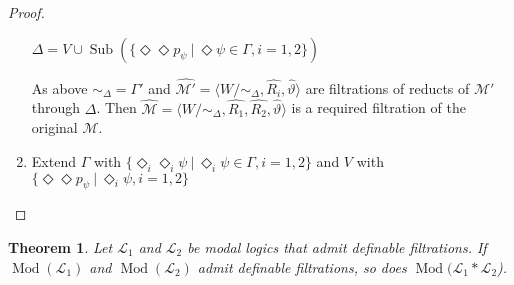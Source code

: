 \documentclass[a4paper]{article}
\theoremstyle{defin}
\theoremstyle{theorem}
\newtheorem{theorem}{Theorem}
\theoremstyle{prop}
\theoremstyle{lemma}
\theoremstyle{fact}
\theoremstyle{exercise}
\theoremstyle{ex}
\theoremstyle{col}
\theoremstyle{claim}
\begin{document}
\begin{proof}
\begin{enumerate}
\begin{center}
    $\Delta = V \cup \operatorname{Sub}(\{ \Diamond \Diamond p_{\psi} \: | \: \Diamond \psi \in \Gamma, i = 1,2 \})$
  \end{center}
  As above $\sim_{\Delta} = \Gamma'$ and $\widehat{\mathcal{M}'} = \langle W /\sim_{\Delta}, \widehat{R_i}, \widehat{\vartheta} \rangle$ are filtrations of reducts of $\mathcal{M}'$ through $\Delta$. Then $\widehat{\mathcal{M}} = \langle W /\sim_{\Delta}, \widehat{R_1}, \widehat{R_2}, \widehat{\vartheta} \rangle$ is a required filtration of the original $\mathcal{M}$.
  \item Extend $\Gamma$ with $\{ \Diamond_i \Diamond_i \psi \: | \: \Diamond_i \psi \in \Gamma, i = 1,2 \}$ and
  $V$ with $\{\Diamond \Diamond p_{\psi} \: | \: \Diamond_i {\psi}, i = 1, 2\}$
  \end{enumerate}
\end{proof}

\begin{theorem}
  Let $\mathcal{L}_1$ and $\mathcal{L}_2$ be modal logics that admit definable filtrations. If $\operatorname{Mod}(\mathcal{L}_1)$ and $\operatorname{Mod}(\mathcal{L}_2)$ admit definable filtrations, so does $\operatorname{Mod}(\mathcal{L}_1 * \mathcal{L}_2$).
\end{theorem}
\end{document}

